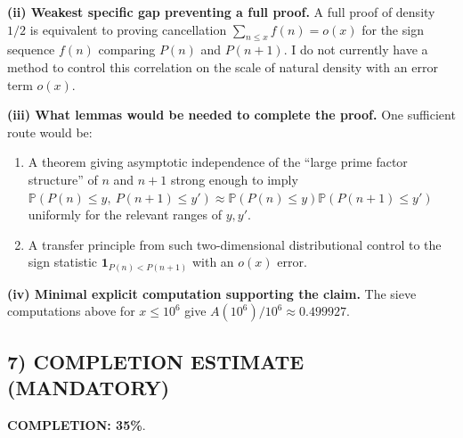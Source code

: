 \noindent\textbf{(ii) Weakest specific gap preventing a full proof.}
A full proof of density $1/2$ is equivalent to proving cancellation
\(\sum_{n\le x} f(n)=o(x)\) for the sign sequence $f(n)$ comparing $P(n)$ and $P(n+1)$. I do not currently have a method to control this correlation on the scale of natural density with an error term $o(x)$.

\noindent\textbf{(iii) What lemmas would be needed to complete the proof.}
One sufficient route would be:
\begin{enumerate}[leftmargin=2.5em]
\item A theorem giving asymptotic independence of the ``large prime factor structure'' of $n$ and $n+1$ strong enough to imply
\(\mathbb{P}(P(n)\le y,\ P(n+1)\le y')\approx \mathbb{P}(P(n)\le y)\mathbb{P}(P(n+1)\le y')\)
uniformly for the relevant ranges of $y,y'$.
\item A transfer principle from such two-dimensional distributional control to the sign statistic $\mathbf{1}_{P(n)<P(n+1)}$ with an $o(x)$ error.
\end{enumerate}

\noindent\textbf{(iv) Minimal explicit computation supporting the claim.}
The sieve computations above for $x\le 10^6$ give $A(10^6)/10^6\approx 0.499927$.

\subsection*{7) COMPLETION ESTIMATE (MANDATORY)}
\textbf{COMPLETION: 35\%}.


